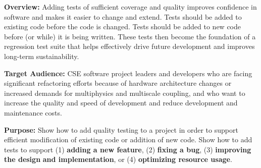 \documentclass[]{article}
\date{}
\begin{document}
\pagestyle{fancy}
\renewcommand{\headrulewidth}{0pt}
  
\thispagestyle{empty}
\textbf{\newline}
\textbf{\newline}


\textbf{Overview:} Adding tests of sufficient coverage and quality
improves confidence in software and makes it easier to change and
extend. Tests should be added to existing code before the code is
changed. Tests should be added to new code before (or while) it is being
written. These tests then become the foundation of a regression test
suite that helps effectively drive future development and improves
long-term sustainability.

\textbf{Target Audience:} CSE software project leaders and developers
who are facing significant refactoring efforts because of hardware
architecture changes or increased demands for multiphysics and
multiscale coupling, and who want to increase the quality and speed of
development and reduce development and maintenance costs.

\textbf{Purpose:} Show how to add quality testing to a project in order
to support efficient modification of existing code or addition of new
code. Show how to add tests to support (1) \textbf{adding a new
feature}, (2) \textbf{fixing a bug}, (3) \textbf{improving the design}
\textbf{and implementation}, or (4) \textbf{optimizing resource usage}.
\end{document}

